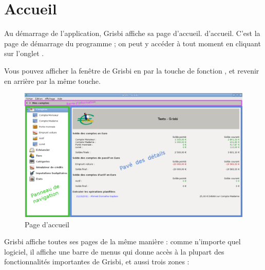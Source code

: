 
\chapter{Accueil\label{home}}


Au démarrage de l'application, Grisbi affiche sa page 
\ifIllustration d'accueil.
\else d'accueil.
\fi
C'est la page de démarrage du programme ; on peut y accéder à tout moment en cliquant sur l'onglet . 

Vous pouvez afficher la fenêtre de Grisbi en  par la touche de fonction , et revenir en arrière par la même touche.

\ifIllustration
\begin{figure}[htbp]
\begin{center}
\includegraphics[scale=0.35]{image/screenshot/home}
\end{center}
\caption{Page d'accueil}
\label{home-img}
\end{figure}
\fi

Grisbi affiche toutes ses pages de la même manière : comme n'importe quel logiciel, il affiche une barre de menus qui donne accès à la plupart des fonctionnalités importantes de Grisbi, et aussi trois zones :

